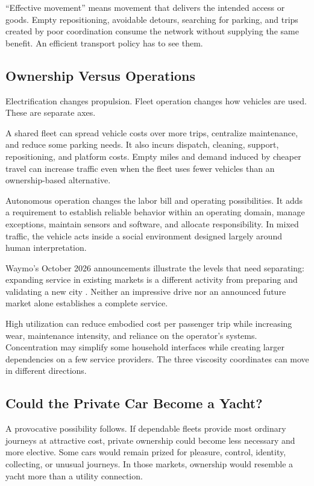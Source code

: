 \documentclass[11pt,openany]{book}
\begin{document}
“Effective movement” means movement that delivers the intended access or goods. Empty repositioning, avoidable detours, searching for parking, and trips created by poor coordination consume the network without supplying the same benefit. An efficient transport policy has to see them.

\subsection{Ownership Versus Operations}

Electrification changes propulsion. Fleet operation changes how vehicles are used. These are separate axes.

A shared fleet can spread vehicle costs over more trips, centralize maintenance, and reduce some parking needs. It also incurs dispatch, cleaning, support, repositioning, and platform costs. Empty miles and demand induced by cheaper travel can increase traffic even when the fleet uses fewer vehicles than an ownership-based alternative.

Autonomous operation changes the labor bill and operating possibilities. It adds a requirement to establish reliable behavior within an operating domain, manage exceptions, maintain sensors and software, and allocate responsibility. In mixed traffic, the vehicle acts inside a social environment designed largely around human interpretation.

Waymo's October 2026 announcements illustrate the levels that need separating: expanding service in existing markets is a different activity from preparing and validating a new city \cite{waymo2026expansion,waymo2026madrid,waymo2026toronto}. Neither an impressive drive nor an announced future market alone establishes a complete service.

High utilization can reduce embodied cost per passenger trip while increasing wear, maintenance intensity, and reliance on the operator's systems. Concentration may simplify some household interfaces while creating larger dependencies on a few service providers. The three viscosity coordinates can move in different directions.

\subsection{Could the Private Car Become a Yacht?}

A provocative possibility follows. If dependable fleets provide most ordinary journeys at attractive cost, private ownership could become less necessary and more elective. Some cars would remain prized for pleasure, control, identity, collecting, or unusual journeys. In those markets, ownership would resemble a yacht more than a utility connection.
\end{document}
